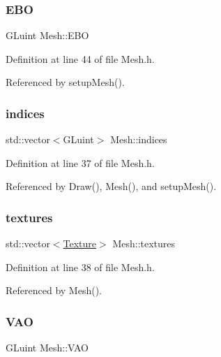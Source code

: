 \subsubsection{\texorpdfstring{E\+BO}{EBO}}
{\footnotesize\ttfamily G\+Luint Mesh\+::\+E\+BO\hspace{0.3cm}{\ttfamily [private]}}



Definition at line 44 of file Mesh.\+h.



Referenced by setup\+Mesh().

\mbox{\label{classMesh_a5e55b84c6c967608bcf23ed7d68e4215}} 
\subsubsection{\texorpdfstring{indices}{indices}}
{\footnotesize\ttfamily std\+::vector$<$G\+Luint$>$ Mesh\+::indices}



Definition at line 37 of file Mesh.\+h.



Referenced by Draw(), Mesh(), and setup\+Mesh().

\mbox{\label{classMesh_abf1e672703bf4f8e104f3b076faaf958}} 
\subsubsection{\texorpdfstring{textures}{textures}}
{\footnotesize\ttfamily std\+::vector$<$\mbox{\hyperlink{structTexture}{Texture}}$>$ Mesh\+::textures}



Definition at line 38 of file Mesh.\+h.



Referenced by Mesh().

\mbox{\label{classMesh_a09b989b9d4df8ae595d7e80e091a4a5b}} 
\subsubsection{\texorpdfstring{V\+AO}{VAO}}
{\footnotesize\ttfamily G\+Luint Mesh\+::\+V\+AO\hspace{0.3cm}{\ttfamily [private]}}



